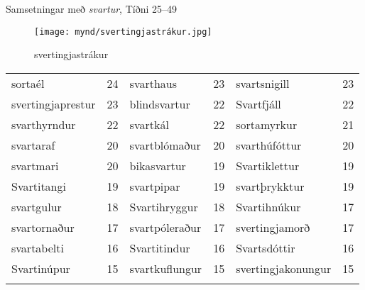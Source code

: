\documentclass[../samsetningasafn.tex]{subfiles}
\begin{document}
\begin{wordlist}[H]
\begin{tcolorbox}
\end{tcolorbox}
	\caption{Samsetningar með \textit{svartur}, Tíðni 25--49}
	\label{listi:svart.25}
\end{wordlist}

\begin{figure}[H]
\begin{tcolorbox}
\centering
	\texttt{[image: mynd/svertingjastrákur.jpg]}
\end{tcolorbox}
	\caption{svertingjastrákur}
	\label{mynd:svertingjastrákur}
\end{figure}

\begin{wordlist}[H]
\begin{tcolorbox}
\begin{footnotesize}

	\setlength{\extrarowheight}{3pt}
	\begin{tabular}{BlBlBl}	
		sortaél	& 24		& 
		svarthaus	& 23		& 
		svartsnigill	& 23		\\ 
		svertingjaprestur & 23	& 
		blindsvartur	& 22		& 
		Svartfjáll	& 22		\\ 
		svarthyrndur & 22		& 
		svartkál	& 22		& 
		sortamyrkur	& 21		\\ 
		svartaraf	& 20		& 
		svartblómaður & 20		& 
		svarthúfóttur & 20		\\ 
		svartmari	& 20		& 
		bikasvartur	& 19		& 
		Svartiklettur 	& 19		\\ 
		Svartitangi	& 19		& 
		svartpipar	& 19		& 
		svartþrykktur & 19		\\ 
		svartgulur 	& 18		& 
		Svartihryggur & 18		& 
		Svartihnúkur	& 17		\\ 
		svartornaður	& 17		& 
		svartpóleraður & 17	& 
		svertingjamorð & 17	\\ 
		svartabelti	& 16		& 
		Svartitindur	& 16		& 
		Svartsdóttir	& 16		\\ 
		Svartinúpur	& 15		& 
		svartkuflungur & 15		& 
		svertingjakonungur & 15	\\ 

\end{tabular}
\end{footnotesize}
\end{tcolorbox}
\end{wordlist}
\end{document}
